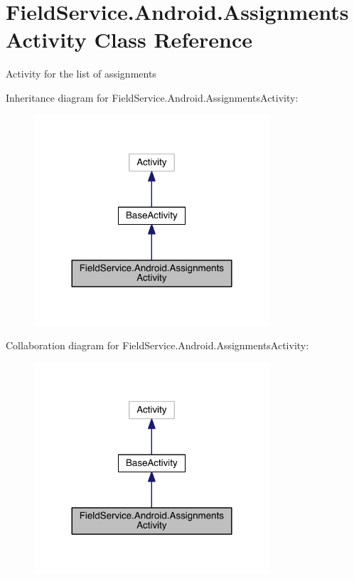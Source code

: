 \hypertarget{class_field_service_1_1_android_1_1_assignments_activity}{\section{Field\+Service.\+Android.\+Assignments\+Activity Class Reference}
\label{class_field_service_1_1_android_1_1_assignments_activity}
}


Activity for the list of assignments  




Inheritance diagram for Field\+Service.\+Android.\+Assignments\+Activity\+:
\nopagebreak
\begin{figure}[H]
\begin{center}
\leavevmode
\includegraphics[width=248pt]{class_field_service_1_1_android_1_1_assignments_activity__inherit__graph}
\end{center}
\end{figure}


Collaboration diagram for Field\+Service.\+Android.\+Assignments\+Activity\+:
\nopagebreak
\begin{figure}[H]
\begin{center}
\leavevmode
\includegraphics[width=248pt]{class_field_service_1_1_android_1_1_assignments_activity__coll__graph}
\end{center}
\end{figure}
